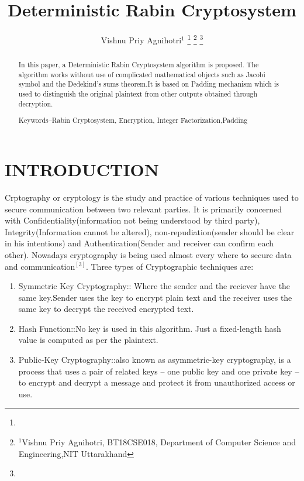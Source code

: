 \documentclass[letterpaper, 12 pt, conference]{ieeeconf}  %
\title{\LARGE \bf
Deterministic Rabin Cryptosystem
}
\author{Vishnu Priy Agnihotri$^{1}$ %
\thanks{}%
\thanks{$^{1}$Vishnu Priy Agnihotri, BT18CSE018, Department of Computer Science and Engineering,NIT Uttarakhand}%
\thanks{}%
}
\begin{document}
\maketitle
\thispagestyle{empty}
\pagestyle{empty}


\begin{abstract}

In this paper, a Deterministic Rabin Cryptosystem algorithm is proposed. The algorithm works without use of complicated mathematical objects such as Jacobi symbol and the Dedekind's sums theorem.It is based on Padding mechanism which is used to distinguish the original plaintext from other outputs obtained through decryption.


Keywords--Rabin Cryptosystem, Encryption, Integer Factorization,Padding



\end{abstract}


\section{INTRODUCTION}

Crptography or cryptology is the study and practice of various techniques used to secure communication between two relevant parties. It is primarily concerned with Confidentiality(information not being understood by third party), Integrity(Information cannot be altered), non-repudiation(sender should be clear in his intentions) and Authentication(Sender and receiver can confirm each other). Nowadays cryptography is being used almost every where to secure data and communication$^{[3]}$.
Three types of Cryptographic techniques are:
\begin{enumerate}
  \item Symmetric Key Cryptography:: Where the sender and the reciever have the same key.Sender uses the key to encrypt plain text and the receiver uses the same key to decrypt the received encrypted text.
  \item Hash Function::No key is used in this algorithm. Just a fixed-length hash value is computed as per the plaintext.
  \item Public-Key Cryptography::also known as asymmetric-key cryptography, is a process that uses a pair of related keys -- one public key and one private key -- to encrypt and decrypt a message and protect it from unauthorized access or use.
\end{enumerate}
\end{document}
